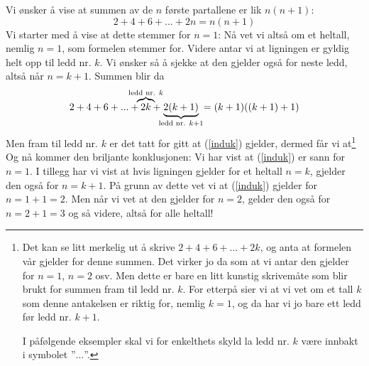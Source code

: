 Vi ønsker å vise at summen av de $ n $ første partallene er lik $ n(n+1) $:
\begin{equation}
2+4+6+...+2n=n(n+1) \label{induk}
\end{equation}
Vi starter med å vise at dette stemmer for $ {n=1} $:
Nå vet vi altså om et heltall, nemlig $ {n=1} $, som formelen stemmer for. Videre antar vi at ligningen er gyldig helt opp til ledd nr. $ k $. Vi ønsker så å sjekke at den gjelder også for neste ledd, altså  når $ n=k+1 $. Summen blir da
\[ 2+4+6+...+\quad\mathclap{\overbrace{2k}^{\text{ledd nr. }k} \;\;\;\,}+\quad\;\;\;\mathclap{\underbrace{2(k+1)}_{\text{ledd nr. }k+1}}\qquad=(k+1)((k+1)+1) \]
Men fram til ledd nr. $ k $ er det tatt for gitt at (\ref{induk}) gjelder, dermed får vi at\footnote{Det kan se litt merkelig ut å skrive $ {2+4+6+...+2k }$, og anta at formelen vår gjelder for denne summen. Det virker jo da som at vi antar den gjelder for $ {n=1 }$, $ {n=2 }$ osv. Men dette er bare en litt kunstig skrivemåte som blir brukt for summen fram til ledd nr. $ k $. For etterpå sier vi at vi vet om et tall $ k $ som denne antakelsen er riktig for, nemlig $ {k=1} $, og da har vi jo bare ett ledd før ledd nr. $ {k+1} $. 
	
I påfølgende eksempler skal vi for enkelthets skyld la ledd nr. $ k $ være innbakt i symbolet ''$ ... $''. }
Og nå kommer den briljante konklusjonen: Vi har vist at (\ref{induk}) er sann for ${ n=1 }$. I tillegg har vi vist at hvis ligningen gjelder for et heltall ${n= k} $, gjelder den også for $ {n=k+1} $. På grunn av dette vet vi at (\ref{induk}) gjelder for ${n= 1+1=2} $. Men når vi vet at den gjelder for $ {n=2} $, gelder den også for $ {n=2+1=3} $ og så videre, altså for alle heltall!\regv
\ind
{}
